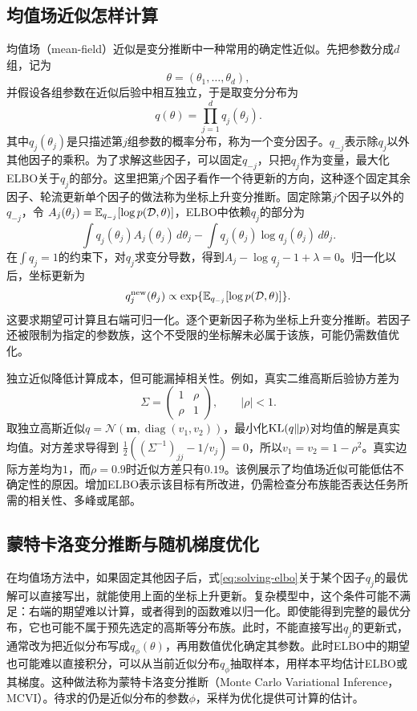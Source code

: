 \subsection{均值场近似怎样计算}
均值场（mean-field）近似是变分推断中一种常用的确定性近似。先把参数分成$d$组，记为
\begin{equation}
 \theta=(\theta_1,\ldots,\theta_d),
\end{equation}
并假设各组参数在近似后验中相互独立，于是取变分分布为
\begin{equation}
 q(\theta)=\prod_{j=1}^d q_j(\theta_j).
\end{equation}
其中$q_j(\theta_j)$是只描述第$j$组参数的概率分布，称为一个变分因子。$q_{-j}$表示除$q_j$以外其他因子的乘积。为了求解这些因子，可以固定$q_{-j}$，只把$q_j$作为变量，最大化ELBO关于$q_j$的部分。这里把第$j$个因子看作一个待更新的方向，这种逐个固定其余因子、轮流更新单个因子的做法称为坐标上升变分推断。固定除第$j$个因子以外的$q_{-j}$，令
$A_j(\theta_j)=\mathbb{E}_{q_{-j}}[\log p(\mathcal D,\theta)]$，ELBO中依赖$q_j$的部分为
\begin{equation}
 \int q_j(\theta_j)A_j(\theta_j)\,d\theta_j
 -\int q_j(\theta_j)\log q_j(\theta_j)\,d\theta_j.
\end{equation}
在$\int q_j=1$的约束下，对$q_j$求变分导数，得到$A_j-\log q_j-1+\lambda=0$。归一化以后，坐标更新为
\begin{equation}
 q_j^{\mathrm{new}}(\theta_j)\propto
 \exp\{\mathbb{E}_{q_{-j}}[\log p(\mathcal D,\theta)]\}.
\end{equation}
这要求期望可计算且右端可归一化。逐个更新因子称为坐标上升变分推断。若因子还被限制为指定的参数族，这个不受限的坐标解未必属于该族，可能仍需数值优化。

独立近似降低计算成本，但可能漏掉相关性。例如，真实二维高斯后验协方差为
\begin{equation}
 \Sigma=\begin{pmatrix}1&\rho\\\rho&1\end{pmatrix},\qquad |\rho|<1.
\end{equation}
取独立高斯近似$q=\mathcal N(\bm m,\operatorname{diag}(v_1,v_2))$，最小化$\operatorname{KL}(q\|p)$对均值的解是真实均值。对方差求导得到
$\tfrac12((\Sigma^{-1})_{jj}-1/v_j)=0$，所以$v_1=v_2=1-\rho^2$。真实边际方差均为$1$，而$\rho=0.9$时近似方差只有$0.19$。该例展示了均值场近似可能低估不确定性的原因。增加ELBO表示该目标有所改进，仍需检查分布族能否表达任务所需的相关性、多峰或尾部。

\subsection{蒙特卡洛变分推断与随机梯度优化}
在均值场方法中，如果固定其他因子后，式\eqref{eq:solving-elbo}关于某个因子$q_j$的最优解可以直接写出，就能使用上面的坐标上升更新。复杂模型中，这个条件可能不满足：右端的期望难以计算，或者得到的函数难以归一化。即使能得到完整的最优分布，它也可能不属于预先选定的高斯等分布族。此时，不能直接写出$q_j$的更新式，通常改为把近似分布写成$q_\phi(\theta)$，再用数值优化确定其参数。此时ELBO中的期望也可能难以直接积分，可以从当前近似分布$q_\phi$抽取样本，用样本平均估计ELBO或其梯度。这种做法称为蒙特卡洛变分推断（Monte Carlo Variational Inference，MCVI）。待求的仍是近似分布的参数$\phi$，采样为优化提供可计算的估计。

